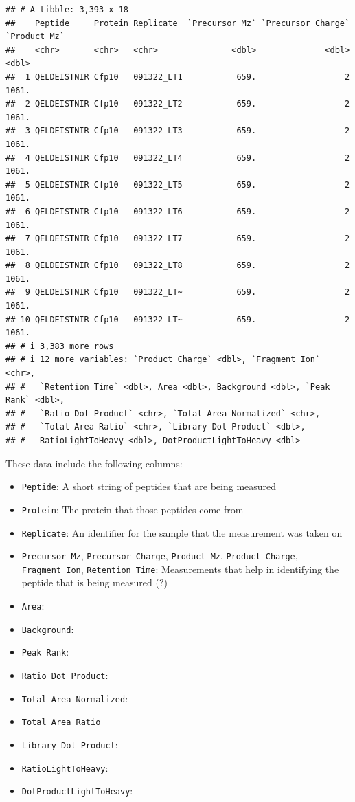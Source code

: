 \documentclass[
]{book}
\providecommand{\tightlist}{%
  \setlength{\itemsep}{0pt}\setlength{\parskip}{0pt}}
\begin{document}
\begin{verbatim}
## # A tibble: 3,393 x 18
##    Peptide     Protein Replicate  `Precursor Mz` `Precursor Charge` `Product Mz`
##    <chr>       <chr>   <chr>               <dbl>              <dbl>        <dbl>
##  1 QELDEISTNIR Cfp10   091322_LT1           659.                  2        1061.
##  2 QELDEISTNIR Cfp10   091322_LT2           659.                  2        1061.
##  3 QELDEISTNIR Cfp10   091322_LT3           659.                  2        1061.
##  4 QELDEISTNIR Cfp10   091322_LT4           659.                  2        1061.
##  5 QELDEISTNIR Cfp10   091322_LT5           659.                  2        1061.
##  6 QELDEISTNIR Cfp10   091322_LT6           659.                  2        1061.
##  7 QELDEISTNIR Cfp10   091322_LT7           659.                  2        1061.
##  8 QELDEISTNIR Cfp10   091322_LT8           659.                  2        1061.
##  9 QELDEISTNIR Cfp10   091322_LT~           659.                  2        1061.
## 10 QELDEISTNIR Cfp10   091322_LT~           659.                  2        1061.
## # i 3,383 more rows
## # i 12 more variables: `Product Charge` <dbl>, `Fragment Ion` <chr>,
## #   `Retention Time` <dbl>, Area <dbl>, Background <dbl>, `Peak Rank` <dbl>,
## #   `Ratio Dot Product` <chr>, `Total Area Normalized` <chr>,
## #   `Total Area Ratio` <chr>, `Library Dot Product` <dbl>,
## #   RatioLightToHeavy <dbl>, DotProductLightToHeavy <dbl>
\end{verbatim}

These data include the following columns:

\begin{itemize}
\tightlist
\item
  \texttt{Peptide}: A short string of peptides that are being measured
\item
  \texttt{Protein}: The protein that those peptides come from
\item
  \texttt{Replicate}: An identifier for the sample that the measurement was taken on
\item
  \texttt{Precursor\ Mz}, \texttt{Precursor\ Charge}, \texttt{Product\ Mz}, \texttt{Product\ Charge},
  \texttt{Fragment\ Ion}, \texttt{Retention\ Time}: Measurements that help in identifying the peptide
  that is being measured (?)
\item
  \texttt{Area}:
\item
  \texttt{Background}:
\item
  \texttt{Peak\ Rank}:
\item
  \texttt{Ratio\ Dot\ Product}:
\item
  \texttt{Total\ Area\ Normalized}:
\item
  \texttt{Total\ Area\ Ratio}
\item
  \texttt{Library\ Dot\ Product}:
\item
  \texttt{RatioLightToHeavy}:
\item
  \texttt{DotProductLightToHeavy}:
\end{itemize}
\end{document}
